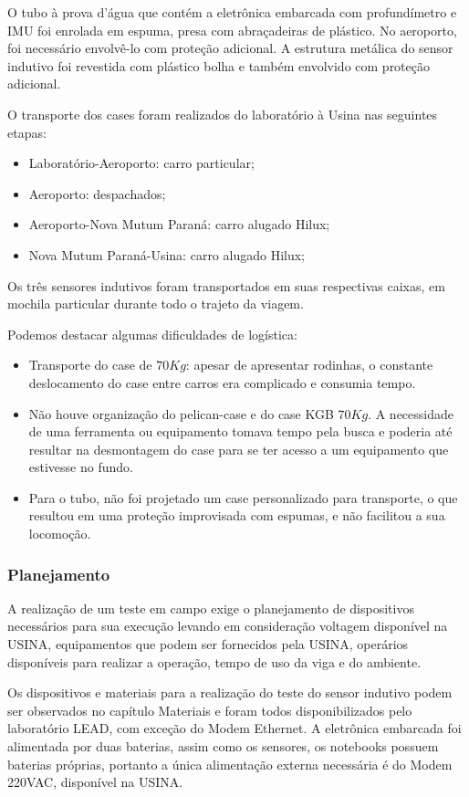 O tubo à prova d'água que contém a eletrônica embarcada com profundímetro e
IMU foi enrolada em espuma, presa com abraçadeiras de plástico. No aeroporto,
foi necessário envolvê-lo com proteção adicional. A estrutura metálica do sensor
indutivo foi revestida com plástico bolha e também envolvido com proteção
adicional.

O transporte dos cases foram realizados do laboratório à Usina nas
seguintes etapas:
\begin{itemize}
  \item Laboratório-Aeroporto: carro particular;
  \item Aeroporto: despachados;
  \item Aeroporto-Nova Mutum Paraná: carro alugado Hilux;
  \item Nova Mutum Paraná-Usina: carro alugado Hilux;
\end{itemize} 

Os três sensores indutivos foram transportados em suas respectivas caixas, em
mochila particular durante todo o trajeto da viagem.

Podemos destacar algumas dificuldades de logística:
\begin{itemize}
  \item Transporte do case de $70 Kg$: apesar de apresentar rodinhas, o
  constante deslocamento do case entre carros era complicado e consumia tempo.
  \item Não houve organização do pelican-case e do case KGB $70 Kg$. A
  necessidade de uma ferramenta ou equipamento tomava tempo pela busca e poderia
  até resultar na desmontagem do case para se ter acesso a um equipamento que
  estivesse no fundo.
  \item Para o tubo, não foi projetado um case personalizado para transporte, o
  que resultou em uma proteção improvisada com espumas, e não facilitou a sua locomoção. 
\end{itemize} 
 
\subsubsection{Planejamento}
A realização de um teste em campo exige o planejamento de dispositivos
necessários para sua execução levando em consideração voltagem disponível na
USINA, equipamentos que podem ser fornecidos pela USINA, operários disponíveis
para realizar a operação, tempo de uso da viga e do ambiente.

Os dispositivos e materiais para a realização do teste do sensor indutivo podem
ser observados no capítulo Materiais e foram todos disponibilizados pelo
laboratório LEAD, com exceção do Modem Ethernet. A eletrônica embarcada foi
alimentada por duas baterias, assim como os sensores, os notebooks possuem
baterias próprias, portanto a única alimentação externa necessária é do Modem
220VAC, disponível na USINA.

